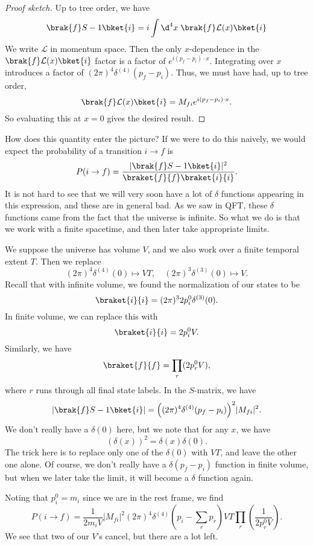 \documentclass[a4paper]{article}
\begin{document}
\begin{proof}[Proof sketch]
  Up to tree order, we have
  \[
    \brak{f} S - 1\bket{i} = i\int \d^4 x\;\brak{f} \mathcal{L}(x)\bket{i}
  \]
  We write $\mathcal{L}$ in momentum space. Then the only $x$-dependence in the $\brak{f} \mathcal{L}(x) \bket{i}$ factor is a factor of $e^{i (p_f - p_i) \cdot x}$. Integrating over $x$ introduces a factor of $(2\pi)^4 \delta^{(4)}(p_f - p_i)$. Thus, we must have had, up to tree order,
  \[
    \brak{f} \mathcal{L}(x) \bket{i} = M_{fi} e^{i(p_f - p_i)\cdot x}.
  \]
  So evaluating this at $x = 0$ gives the desired result.
\end{proof}
How does this quantity enter the picture? If we were to do this naively, we would expect the probability of a transition $i \to f$ is
\[
  P(i \to f) = \frac{|\brak{f}S - 1 \bket{i}|^2}{\braket{f}{f}\braket{i}{i}}.
\]
It is not hard to see that we will very soon have a lot of $\delta$ functions appearing in this expression, and these are in general bad. As we saw in QFT, these $\delta$ functions came from the fact that the universe is infinite. So what we do is that we work with a finite spacetime, and then later take appropriate limits.

We suppose the universe has volume $V$, and we also work over a finite temporal extent $T$. Then we replace
\[
  (2\pi)^4 \delta^{(4)}(0) \mapsto VT,\quad (2\pi)^3 \delta^{(3)}(0) \mapsto V.
\]
Recall that with infinite volume, we found the normalization of our states to be
\[
  \braket{i}{i} = (2\pi)^3 2 p_i^0 \delta^{(3)}(0).
\]
In finite volume, we can replace this with
\[
  \braket{i}{i} = 2p_i^0 V.
\]
Similarly, we have
\[
  \braket{f}{f} = \prod_r (2 p_r^0 V),
\]
where $r$ runs through all final state labels. In the $S$-matrix, we have
\[
  |\brak{f}S - 1 \bket{i}| = \Big((2\pi)^4 \delta^{(4)}(p_f - p_i)\Big)^2 |M_{fi}|^2.
\]
We don't really have a $\delta(0)$ here, but we note that for any $x$, we have
\[
  (\delta(x))^2 = \delta(x) \delta(0).
\]
The trick here is to replace only one of the $\delta(0)$ with $VT$, and leave the other one alone. Of course, we don't really have a $\delta(p_f - p_i)$ function in finite volume, but when we later take the limit, it will become a $\delta$ function again.

Noting that $p_i^0 = m_i$ since we are in the rest frame, we find
\[
  P(i \to f) = \frac{1}{2 m_i V}|M_{fi}|^2 (2\pi)^4 \delta^{(4)}\left(p_i - \sum_r p_r\right) VT \prod_r \left(\frac{1}{2 p_r^0 V}\right).
\]
We see that two of our $V$'s cancel, but there are a lot left.
\end{document}
